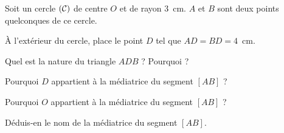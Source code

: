 Soit un cercle $(\cal C)$ de centre $O$ et de rayon 3~cm. $A$ et
$B$ sont deux points quelconques de ce cercle.
\par \`A l'extérieur du cercle, place le point $D$ tel que
$AD=BD=4$~cm.
\begin{myenumerate}
\item Quel est la nature du triangle $ADB$ ? Pourquoi ?
\item Pourquoi $D$ appartient à la médiatrice du segment $[AB]$ ?
\item Pourquoi $O$ appartient à la médiatrice du segment $[AB]$ ?
\item Déduis-en le nom de la médiatrice du segment $[AB]$.
\end{myenumerate}